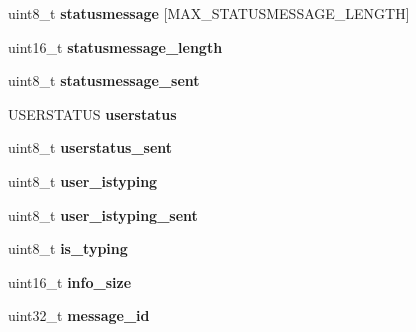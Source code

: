 \begin{DoxyCompactItemize}
\item 
\hypertarget{struct_friend_a8f12612ac1191135a1a5b1cbcbc82852}{uint8\+\_\+t {\bfseries statusmessage} \mbox{[}M\+A\+X\+\_\+\+S\+T\+A\+T\+U\+S\+M\+E\+S\+S\+A\+G\+E\+\_\+\+L\+E\+N\+G\+T\+H\mbox{]}}\label{struct_friend_a8f12612ac1191135a1a5b1cbcbc82852}

\item 
\hypertarget{struct_friend_a43fe9dde52dc12e90933150eca91c0c3}{uint16\+\_\+t {\bfseries statusmessage\+\_\+length}}\label{struct_friend_a43fe9dde52dc12e90933150eca91c0c3}

\item 
\hypertarget{struct_friend_ad39189cd22b356c314e4d980b55db259}{uint8\+\_\+t {\bfseries statusmessage\+\_\+sent}}\label{struct_friend_ad39189cd22b356c314e4d980b55db259}

\item 
\hypertarget{struct_friend_adde524f5a15465585cbc2543cd0b2710}{U\+S\+E\+R\+S\+T\+A\+T\+U\+S {\bfseries userstatus}}\label{struct_friend_adde524f5a15465585cbc2543cd0b2710}

\item 
\hypertarget{struct_friend_af7c74fd36acb972c3a8641fb0781e37e}{uint8\+\_\+t {\bfseries userstatus\+\_\+sent}}\label{struct_friend_af7c74fd36acb972c3a8641fb0781e37e}

\item 
\hypertarget{struct_friend_a68e945edd5a63c22371edf481c788d88}{uint8\+\_\+t {\bfseries user\+\_\+istyping}}\label{struct_friend_a68e945edd5a63c22371edf481c788d88}

\item 
\hypertarget{struct_friend_a8d9e9aef86444e0cde8ec0314f60907e}{uint8\+\_\+t {\bfseries user\+\_\+istyping\+\_\+sent}}\label{struct_friend_a8d9e9aef86444e0cde8ec0314f60907e}

\item 
\hypertarget{struct_friend_a4eb96aff01799d54246cc48854a47175}{uint8\+\_\+t {\bfseries is\+\_\+typing}}\label{struct_friend_a4eb96aff01799d54246cc48854a47175}

\item 
\hypertarget{struct_friend_ac0ae002db55ef8f8366de10ec005b65a}{uint16\+\_\+t {\bfseries info\+\_\+size}}\label{struct_friend_ac0ae002db55ef8f8366de10ec005b65a}

\item 
\hypertarget{struct_friend_aa4420a99dd00b4884b23150e4226b2ea}{uint32\+\_\+t {\bfseries message\+\_\+id}}\label{struct_friend_aa4420a99dd00b4884b23150e4226b2ea}


\end{DoxyCompactItemize}
